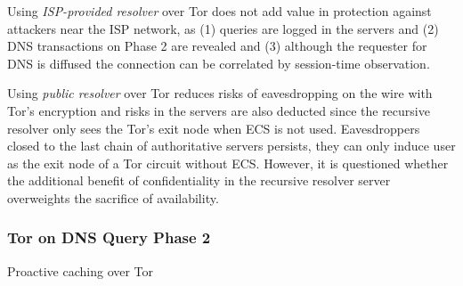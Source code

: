 Using \textit{ISP-provided resolver} over Tor does not add value in protection against attackers near the ISP network, as (1) queries are logged in the servers and (2) DNS transactions on Phase 2 are revealed and (3) although the requester for DNS is diffused the connection can be correlated by session-time observation.

Using \textit{public resolver} over Tor reduces risks of eavesdropping on the wire with Tor's encryption and risks in the servers are also deducted since the recursive resolver only sees the Tor's exit node when ECS is not used.
Eavesdroppers closed to the last chain of authoritative servers persists, they can only induce user as the exit node of a Tor circuit without ECS.
However, it is questioned whether the additional benefit of confidentiality in the recursive resolver server overweights the sacrifice of availability.

\subsubsection{Tor on DNS Query Phase 2}
Proactive caching \cite{cohen2003proactive} over Tor